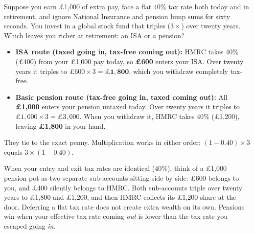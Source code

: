 Suppose you earn \pounds 1,000 of extra pay, face a flat $40\%$ tax rate both today and in retirement, and ignore National Insurance and pension lump sums for sixty seconds. You invest in a global stock fund that triples ($3\times$) over twenty years. Which leaves you richer at retirement: an ISA or a pension?
\begin{itemize}
  \item \textbf{ISA route (taxed going in, tax-free coming out):} HMRC takes $40\%$ (\pounds 400) from your \pounds 1,000 pay today, so \textbf{\pounds 600} enters your ISA. Over twenty years it triples to $\pounds 600 \times 3 = \mathbf{\pounds 1{,}800}$, which you withdraw completely tax-free.
  \item \textbf{Basic pension route (tax-free going in, taxed coming out):} All \textbf{\pounds 1,000} enters your pension untaxed today. Over twenty years it triples to $\pounds 1{,}000 \times 3 = \pounds 3{,}000$. When you withdraw it, HMRC takes $40\%$ (\pounds 1,200), leaving \textbf{\pounds 1,800} in your hand.
\end{itemize}

They tie to the exact penny. Multiplication works in either order: $(1 - 0.40) \times 3$ equals $3 \times (1 - 0.40)$.

\begin{intuitionbox}
When your entry and exit tax rates are identical ($40\%$), think of a \pounds 1,000 pension pot as two separate sub-accounts sitting side by side: \pounds 600 belongs to you, and \pounds 400 silently belongs to HMRC. Both sub-accounts triple over twenty years to \pounds 1,800 and \pounds 1,200, and then HMRC collects its \pounds 1,200 share at the door. Deferring a flat tax rate does not create extra wealth on its own. Pensions win when your effective tax rate coming \emph{out} is lower than the tax rate you escaped going \emph{in}.
\end{intuitionbox}


